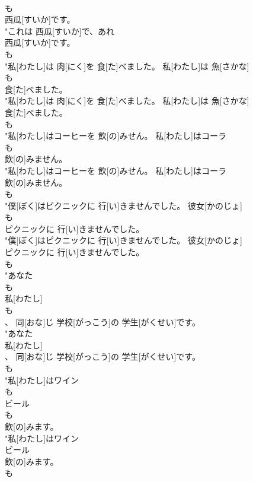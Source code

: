 \documentclass[8pt]{extreport}
\begin{document}
\begin{CJK}{UTF8}{min}
\\	も
\\	西瓜[すいか]です。
\\	"これは 西瓜[すいか]で、あれ
\\	西瓜[すいか]です。
\\	も
\\	"私[わたし]は 肉[にく]を 食[た]べました。 私[わたし]は 魚[さかな]
\\	も
\\	食[た]べました。
\\	"私[わたし]は 肉[にく]を 食[た]べました。 私[わたし]は 魚[さかな]
\\	食[た]べました。
\\	も
\\	"私[わたし]はコーヒーを 飲[の]みせん。 私[わたし]はコーラ
\\	も
\\	飲[の]みません。
\\	"私[わたし]はコーヒーを 飲[の]みせん。 私[わたし]はコーラ
\\	飲[の]みません。
\\	も
\\	"僕[ぼく]はピクニックに 行[い]きませんでした。 彼女[かのじょ]
\\	も
\\	ピクニックに 行[い]きませんでした。
\\	"僕[ぼく]はピクニックに 行[い]きませんでした。 彼女[かのじょ]
\\	ピクニックに 行[い]きませんでした。
\\	も
\\	"あなた
\\	も
\\	私[わたし]
\\	も
\\	、 同[おな]じ 学校[がっこう]の 学生[がくせい]です。
\\	"あなた
\\	私[わたし]
\\	、 同[おな]じ 学校[がっこう]の 学生[がくせい]です。
\\	も
\\	"私[わたし]はワイン
\\	も
\\	ビール
\\	も
\\	飲[の]みます。
\\	"私[わたし]はワイン
\\	ビール
\\	飲[の]みます。
\\	も

\end{CJK}
\end{document}
